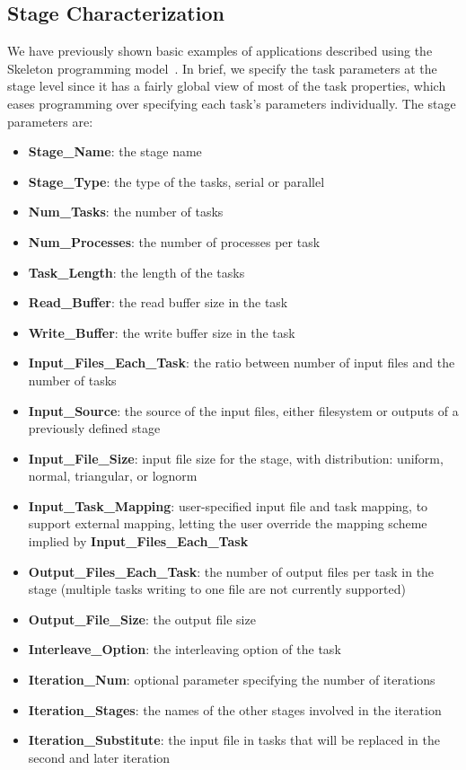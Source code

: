 \documentclass[preprint,12pt]{elsarticle}
\begin{document}
\subsection{Stage Characterization}
\label{ssec:stage_char}
We have previously shown basic examples of applications described using the Skeleton programming model~\cite{Skeleton2013}.
In brief, we specify the task parameters at the stage level since it has a fairly global view of most of the task
properties, which eases programming over specifying each task's parameters individually. The stage parameters are:
\begin{itemize}
\item{\textbf{Stage\_Name}:} the stage name %
\item{\textbf{Stage\_Type}:}  the type of the tasks, serial or parallel
\item{\textbf{Num\_Tasks}:}  the number of tasks
\item{\textbf{Num\_Processes}:} the number of processes per task
\item{\textbf{Task\_Length}:}  the length of the tasks
\item{\textbf{Read\_Buffer}:} the read buffer size in the task
\item{\textbf{Write\_Buffer}:} the write buffer size in the task
\item{\textbf{Input\_Files\_Each\_Task}:}  the ratio between number of input files and the number of tasks
\item{\textbf{Input\_Source}:}  the source of the input files, either filesystem or outputs of a previously defined stage
\item{\textbf{Input\_File\_Size}:}  input file size for the stage, with distribution: uniform, normal, triangular, or lognorm
\item{\textbf{Input\_Task\_Mapping}:} user-specified input file and task mapping, to support external mapping, letting the user override the mapping scheme implied by \textbf{Input\_Files\_Each\_Task}
\item{\textbf{Output\_Files\_Each\_Task}:}  the number of output files per task in the stage (multiple tasks writing to one file are not currently supported)
\item{\textbf{Output\_File\_Size}:}  the output file size
\item{\textbf{Interleave\_Option}:} the interleaving option of the task
\item{\textbf{Iteration\_Num}:} optional parameter specifying the number of iterations
\item{\textbf{Iteration\_Stages}:} the names of the other stages involved in the iteration
\item{\textbf{Iteration\_Substitute}:} the input file in tasks that will be replaced in the second and later iteration %
\end{itemize}
\end{document}
